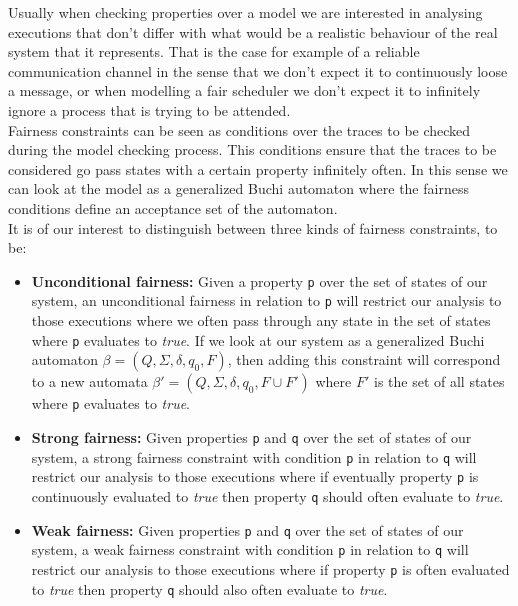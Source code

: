 \documentclass[12pt]{article}
\begin{document}
Usually when checking properties over a model we are interested in analysing 
executions that don't differ with what would be a realistic behaviour of the
real system that it represents. That is the case for example of a reliable
communication channel in the sense that we don't expect it to continuously
loose a message, or when modelling a fair scheduler we don't expect it to
infinitely ignore a process that is trying to be attended.\\
Fairness constraints can be seen as conditions over the traces to be checked
during the model checking process. This conditions ensure that the traces %
to be considered go pass states with a certain property infinitely often. In
this sense we can look at the model as a generalized Buchi automaton where %
the fairness conditions define an acceptance set of the automaton.\\
It is of our interest to distinguish between three kinds of fairness
constraints, to be:
\begin{itemize}

\item \textbf{Unconditional fairness:} Given a property \texttt{p} over the
set of states of our system, an unconditional fairness in relation to
\texttt{p} will restrict our analysis to those executions where we often pass
through any state in the set of states where \texttt{p} evaluates to
\textit{true}. If we look at our system as a generalized Buchi automaton
$\beta=(Q,\Sigma,\delta,q_{0},F)$, then adding this constraint will correspond
to a new automata $\beta'=(Q,\Sigma,\delta,q_{0},F\cup F')$ where $F'$ is the
set of all states where \texttt{p} evaluates to \textit{true}. 

\item \textbf{Strong fairness:} Given properties \texttt{p} and \texttt{q}
over the set of states of our system, a strong fairness constraint with
condition \texttt{p} in relation to \texttt{q} will restrict our analysis
to those executions where if eventually property \texttt{p} is continuously
evaluated to \textit{true} then property \texttt{q} should often evaluate
to \textit{true}. %

\item \textbf{Weak fairness:} Given properties \texttt{p} and \texttt{q}
over the set of states of our system, a weak fairness constraint with
condition \texttt{p} in relation to \texttt{q} will restrict our analysis
to those executions where if property \texttt{p} is often evaluated to 
\textit{true} then property \texttt{q} should also often evaluate to
\textit{true}. %

\end{itemize}
\end{document}
